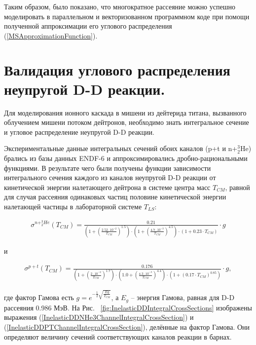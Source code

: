 \documentclass[a4paper,12pt]{article}
\begin{document}
\begin{large}
	Таким образом, было показано, что многократное рассеяние можно успешно моделировать в параллельном и векторизованном программном коде при помощи полученной аппроксимации его углового распределения (\ref{MSApproximationFunction}).
	
	
\clearpage{}
\section{Валидация углового распределения неупругой D-D реакции.}
\label{ValInelasticDD}

	Для моделирования ионного каскада в мишени из дейтерида титана, вызванного облучением мишени потоком дейтронов, необходимо знать интегральное сечение и угловое распределение неупругой D-D реакции. 
	
	Экспериментальные данные интегральных сечений обоих каналов (p+t и n+$^3_2$He) брались из базы данных ENDF-6 и аппроксимировались дробно-рациональными функциями.
	В результате чего были получены функции зависимости интегрального сечения каждого из каналов неупругой D-D реакции от кинетической энергии налетающего дейтрона в системе центра масс $T_{CM}$, равной для случая рассеяния одинаковых частиц половине кинетической энергии налетающей частицы в лабораторной системе $T_{LS}$:
	
\begin{equation}
\label{InelasticDDNHe3ChannelIntegralCrossSection}
\begin{aligned} 
  \sigma^{n+^3_2He}(T_{CM}) = \frac{0.21}{\left( 1 + \left(\frac{2.52\cdot 10^{-2}}{T_{CM}} \right)^{1.5} \right) \cdot \left( 1 + \left( \frac{4.7\cdot 10^{-3}}{T_{CM}} \right)^{4.5} \right) \cdot \left( 1+0.23 \cdot T_{CM} \right) } \cdot g
\end{aligned}
\end{equation}

и

\begin{equation}
\label{InelasticDDPTChannelIntegralCrossSection}
\begin{aligned} 
  \sigma^{p+t}(T_{CM}) = \frac{0.176}{\left( 1 + \left(\frac{2\cdot 10^{-2}}{T_{CM}} \right)^{1.7} \right) \cdot \left( 1.0 + \left( \frac{4.3\cdot 10^{-3}}{T_{CM}} \right)^{4.4} \right) \cdot \left( 1+\left( 0.17 \cdot T_{CM} \right)^{0.85} \right) } \cdot g,
\end{aligned}
\end{equation}
	
	где фактор Гамова есть $g=e^{-\frac{1}{2}\sqrt{\frac{Eg}{T_{CM}}}}$, а $E_g$ -- энергия Гамова, равная для D-D рассеяния 0.986 МэВ.
	На Рис. ~\ref{fig:InelasticDDIntegralCrossSections} изображены выражения (\ref{InelasticDDNHe3ChannelIntegralCrossSection}) и (\ref{InelasticDDPTChannelIntegralCrossSection}), делённые на фактор Гамова.
	Они определяют величину сечений соответствующих каналов реакции в барнах.
	

\end{large}
\end{document}
